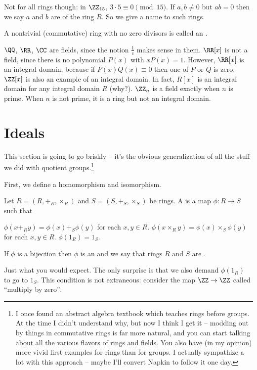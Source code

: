 Not for all rings though: in $\Zc{15}$, $3 \cdot 5 \equiv 0 \pmod{15}$.
If $a, b \neq 0$ but $ab=0$ then we say $a$ and $b$ are 
of the ring $R$.
So we give a name to such rings.
\begin{definition}
	A nontrivial (commutative) ring with no zero divisors
	is called an .
\end{definition}

\begin{example}
	\listhack
	\begin{enumerate}[(a)]
		\ii $\QQ$, $\RR$, $\CC$ are fields, since the notion $\frac 1c$ makes sense in them.
		\ii $\RR[x]$ is not a field, since there is no polynomial $P(x)$ with $xP(x) = 1$.
		However, $\RR[x]$ is an integral domain, because if $P(x) Q(x) \equiv 0$ then one
		of $P$ or $Q$ is zero.
		\ii $\ZZ[x]$ is also an example of an integral domain.
		In fact, $R[x]$ is an integral domain for any integral domain $R$ (why?).
		\ii $\Zc n$ is a field exactly when $n$ is prime.
		When $n$ is not prime, it is a ring but not an integral domain.
	\end{enumerate}
\end{example}

\section{Ideals}
This section is going to go briskly --
it's the obvious generalization of all the stuff we did with quotient groups.\footnote{%
	I once found an abstract algebra textbook which teaches rings
	before groups.  At the time I didn't understand why,
	but now I think I get it -- modding out by things in
	commutative rings is far more natural, and you can start talking
	about all the various flavors of rings and fields.
	You also have (in my opinion) more vivid first examples
	for rings than for groups.
	I actually sympathize a lot with this approach -- maybe I'll convert
	Napkin to follow it one day.}

First, we define a homomorphism and isomorphism.

\begin{definition}
	Let $R = (R, +_R, \times_R)$ and $S = (S, +_S, \times_S)$ be rings.
	A  is a map $\phi : R \to S$
	such that 
	\begin{enumerate}[(i)]
		\ii $\phi(x +_R y) = \phi(x) +_S \phi(y)$ for each $x,y \in R$.
		\ii $\phi(x \times_R y) = \phi(x) \times_S \phi(y)$ for each $x,y \in R$.
		\ii $\phi(1_R) = 1_S$.
	\end{enumerate}
	If $\phi$ is a bijection then $\phi$ is an 
	and we say that rings $R$ and $S$ are .
\end{definition}
Just what you would expect.
The only surprise is that we also demand $\phi(1_R)$ to go to $1_S$.
This condition is not extraneous:
consider the map $\ZZ \to \ZZ$ called ``multiply by zero''.

